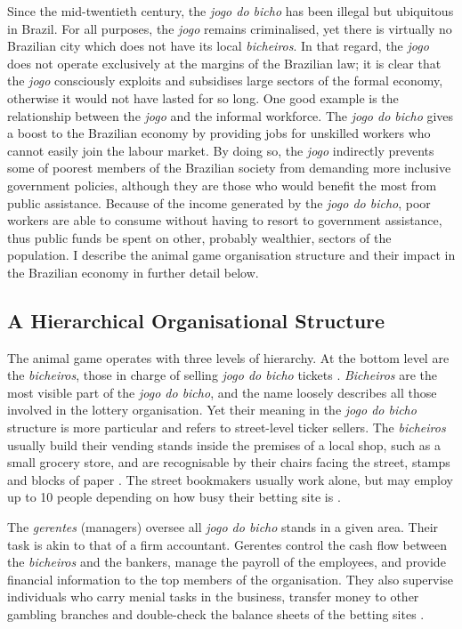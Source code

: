 \documentclass[a4paper,12pt]{article}
\begin{document}
Since the mid-twentieth century, the \textit{jogo do bicho} has been illegal but ubiquitous in Brazil. For all purposes, the \textit{jogo} remains criminalised, yet there is virtually no Brazilian city which does not have its local \textit{bicheiros}. In that regard, the \textit{jogo} does not operate exclusively at the margins of the Brazilian law; it is clear that the \textit{jogo} consciously exploits and subsidises large sectors of the formal economy, otherwise it would not have lasted for so long. One good example is the relationship between the \textit{jogo} and the informal workforce. The \textit{jogo do bicho} gives a boost to the Brazilian economy by providing jobs for unskilled workers who cannot easily join the labour market. By doing so, the \textit{jogo} indirectly prevents some of poorest members of the Brazilian society from demanding more inclusive government policies, although they are those who would benefit the most from public assistance. Because of the income generated by the \textit{jogo do bicho}, poor workers are able to consume without having to resort to government assistance, thus public funds be spent on other, probably wealthier, sectors of the population. I describe the animal game organisation structure and their impact in the Brazilian economy in further detail below.  

\subsection{A Hierarchical Organisational Structure}
\label{sub:organisation}

The animal game operates with three levels of hierarchy. At the bottom level are the \textit{bicheiros}, those in charge of selling \textit{jogo do bicho} tickets \citep{chazkel2007beyond, da1999aguias}. \textit{Bicheiros} are the most visible part of the \textit{jogo do bicho}, and the name loosely describes all those involved in the lottery organisation. Yet their meaning in the \textit{jogo do bicho} structure is more particular and refers to street-level ticker sellers. The \textit{bicheiros}  usually build their vending stands inside the premises of a local shop, such as a small grocery store, and are recognisable by their chairs facing the street, stamps and blocks of paper \citep[259]{chazkel2011laws}. The street bookmakers usually work alone, but may employ up to 10 people depending on how busy their betting site is \citep[69]{labronici2014sorteio}.

The \textit{gerentes} (managers) oversee all \textit{jogo do bicho} stands in a given area. Their task is akin to that of a firm accountant. Gerentes control the cash flow between the \textit{bicheiros} and the bankers, manage the payroll of the employees, and provide financial information to the top members of the organisation. They also supervise individuals who carry menial tasks in the business, transfer money to other gambling branches and double-check the balance sheets of the betting sites \citetext{\citealp[71]{labronici2012paratodos}; \citealp[142]{misse2007illegal}}.
\end{document}
